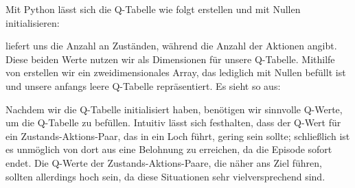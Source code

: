 Mit Python lässt sich die Q-Tabelle wie folgt erstellen und mit Nullen initialisieren:

\medskip



\PYTHON{}



\medskip

 liefert uns die Anzahl an Zuständen, während  die Anzahl der Aktionen angibt. Diese beiden Werte nutzen wir als Dimensionen für unsere Q-Tabelle. Mithilfe von  erstellen wir ein zweidimensionales Array, das lediglich mit Nullen befüllt ist und unsere anfangs leere Q-Tabelle repräsentiert. Es sieht so aus:

\medskip

\PYTHON{[[0. 0. 0. 0.]}

\PYTHON{[0. 0. 0. 0.]}

\PYTHON{[0. 0. 0. 0.]}

\PYTHON{[0. 0. 0. 0.]}

\PYTHON{[0. 0. 0. 0.]}

\PYTHON{[0. 0. 0. 0.]}

\PYTHON{[0. 0. 0. 0.]}

\PYTHON{[0. 0. 0. 0.]}

\PYTHON{[0. 0. 0. 0.]}

\PYTHON{[0. 0. 0. 0.]}

\PYTHON{[0. 0. 0. 0.]}

\PYTHON{[0. 0. 0. 0.]}

\PYTHON{[0. 0. 0. 0.]}

\PYTHON{[0. 0. 0. 0.]}

\PYTHON{[0. 0. 0. 0.]}

\PYTHON{[0. 0. 0. 0.]]}

\medskip

Nachdem wir die Q-Tabelle initialisiert haben, benötigen wir sinnvolle Q-Werte, um die Q-Tabelle zu befüllen. Intuitiv lässt sich festhalten, dass der Q-Wert für ein Zustands-Aktions-Paar, das in ein Loch führt, gering sein sollte; schließlich ist es unmöglich von dort aus eine Belohnung zu erreichen, da die Episode sofort endet. Die Q-Werte der Zustands-Aktions-Paare, die näher ans Ziel führen, sollten allerdings hoch sein, da diese Situationen sehr vielversprechend sind.

